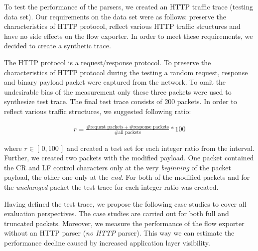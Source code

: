 To test the performance of the parsers, we created an HTTP traffic trace (testing data set). Our requirements on the data set were as follows: preserve the characteristics of HTTP protocol, reflect various HTTP traffic structures and have no side effects on the flow exporter. In order to meet these requirements, we decided to create a synthetic trace.

The HTTP protocol is a request/response protocol. To preserve the characteristics of HTTP protocol during the testing a random request, response and binary payload packet were captured from the network. To omit the undesirable bias of the measurement only these three packets were used to synthesize test trace. The final test trace consists of 200 packets. In order to reflect various traffic structures, we suggested following ratio:

\begin{align}
       r = \frac{\# \text{request packets}+\#\text{response packets}}{\#\text{all packets}}*100
\end{align}

where $r \in [\,0,100\,]$ and created a test set for each integer ratio from the interval. Further, we created two packets with the modified payload. One packet contained the CR and LF control characters only at the very \emph{beginning} of the packet payload, the other one only at the \emph{end}. For both of the modified packets and for the \emph{unchanged} packet the test trace for each integer ratio was created.


Having defined the test trace, we propose the following case studies to cover all evaluation perspectives. The case studies are carried out for both full and truncated packets. Moreover, we measure the performance of the flow exporter without an HTTP parser (\emph{no HTTP} parser). This way we can estimate the performance decline caused by increased application layer visibility.


